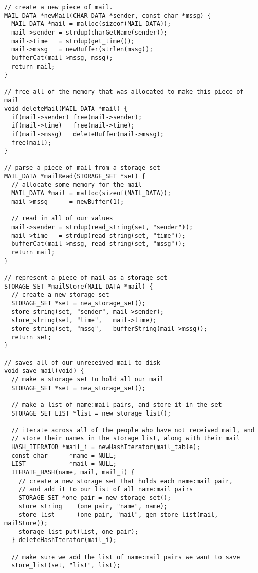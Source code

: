 \documentclass[12pt]{article}
\begin{document}
{\begin{verbatim}
// create a new piece of mail.
MAIL_DATA *newMail(CHAR_DATA *sender, const char *mssg) {
  MAIL_DATA *mail = malloc(sizeof(MAIL_DATA));
  mail->sender = strdup(charGetName(sender));
  mail->time   = strdup(get_time());
  mail->mssg   = newBuffer(strlen(mssg));
  bufferCat(mail->mssg, mssg);
  return mail;
}

// free all of the memory that was allocated to make this piece of mail
void deleteMail(MAIL_DATA *mail) {
  if(mail->sender) free(mail->sender);
  if(mail->time)   free(mail->time);
  if(mail->mssg)   deleteBuffer(mail->mssg);
  free(mail);
}

// parse a piece of mail from a storage set
MAIL_DATA *mailRead(STORAGE_SET *set) {
  // allocate some memory for the mail
  MAIL_DATA *mail = malloc(sizeof(MAIL_DATA));
  mail->mssg      = newBuffer(1);

  // read in all of our values
  mail->sender = strdup(read_string(set, "sender"));
  mail->time   = strdup(read_string(set, "time"));
  bufferCat(mail->mssg, read_string(set, "mssg"));
  return mail;
}

// represent a piece of mail as a storage set
STORAGE_SET *mailStore(MAIL_DATA *mail) {
  // create a new storage set
  STORAGE_SET *set = new_storage_set();
  store_string(set, "sender", mail->sender);
  store_string(set, "time",   mail->time);
  store_string(set, "mssg",   bufferString(mail->mssg));
  return set;
}

// saves all of our unreceived mail to disk
void save_mail(void) {
  // make a storage set to hold all our mail
  STORAGE_SET *set = new_storage_set();

  // make a list of name:mail pairs, and store it in the set
  STORAGE_SET_LIST *list = new_storage_list();

  // iterate across all of the people who have not received mail, and
  // store their names in the storage list, along with their mail
  HASH_ITERATOR *mail_i = newHashIterator(mail_table);
  const char      *name = NULL;
  LIST            *mail = NULL;
  ITERATE_HASH(name, mail, mail_i) {
    // create a new storage set that holds each name:mail pair,
    // and add it to our list of all name:mail pairs
    STORAGE_SET *one_pair = new_storage_set();
    store_string    (one_pair, "name", name);
    store_list      (one_pair, "mail", gen_store_list(mail, mailStore));
    storage_list_put(list, one_pair);
  } deleteHashIterator(mail_i);

  // make sure we add the list of name:mail pairs we want to save
  store_list(set, "list", list);


\end{verbatim}}
\end{document}
